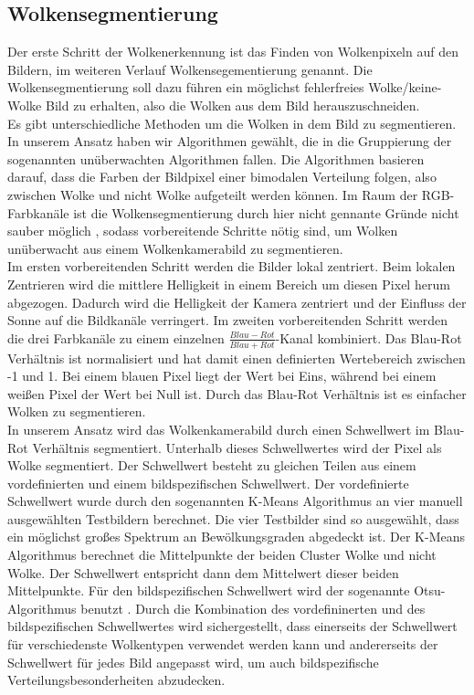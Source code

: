 \documentclass[a4paper,11pt,twoside,german]{article}
\begin{document}
\subsection{Wolkensegmentierung}
Der erste Schritt der Wolkenerkennung ist das Finden von Wolkenpixeln auf den Bildern, im weiteren Verlauf Wolkensegementierung genannt. Die Wolkensegmentierung soll dazu führen ein möglichst fehlerfreies Wolke/keine-Wolke Bild zu erhalten, also die Wolken aus dem Bild herauszuschneiden.\\
Es gibt unterschiedliche Methoden um die Wolken in dem Bild zu segmentieren. In unserem Ansatz haben wir Algorithmen gewählt, die in die Gruppierung der sogenannten unüberwachten Algorithmen fallen. Die Algorithmen basieren darauf, dass die Farben der Bildpixel einer bimodalen Verteilung folgen, also zwischen Wolke und nicht Wolke aufgeteilt werden können. Im Raum der RGB-Farbkanäle ist die Wolkensegmentierung durch hier nicht gennante Gründe nicht sauber möglich \citep{dev_14_color}, sodass vorbereitende Schritte nötig sind, um Wolken unüberwacht aus einem Wolkenkamerabild zu segmentieren.\\
Im ersten vorbereitenden Schritt werden die Bilder lokal zentriert. Beim lokalen Zentrieren wird die mittlere Helligkeit in einem Bereich um diesen Pixel herum abgezogen. Dadurch wird die Helligkeit der Kamera zentriert und der Einfluss der Sonne auf die Bildkanäle verringert. Im zweiten vorbereitenden Schritt werden die drei Farbkanäle zu einem einzelnen $\frac{Blau-Rot}{Blau+Rot}$-Kanal kombiniert. Das Blau-Rot Verhältnis ist normalisiert und hat damit einen definierten Wertebereich zwischen -1 und 1. Bei einem blauen Pixel liegt der Wert bei Eins, während bei einem weißen Pixel der Wert bei Null ist. Durch das Blau-Rot Verhältnis ist es einfacher Wolken zu segmentieren.\\
In unserem Ansatz wird das Wolkenkamerabild durch einen Schwellwert im Blau-Rot Verhältnis segmentiert. Unterhalb dieses Schwellwertes wird der Pixel als Wolke segmentiert. Der Schwellwert besteht zu gleichen Teilen aus einem vordefinierten und einem bildspezifischen Schwellwert. Der vordefinierte Schwellwert wurde durch den sogenannten K-Means Algorithmus \citep{james_13_introduction} an vier manuell ausgewählten Testbildern berechnet. Die vier Testbilder sind so ausgewählt, dass ein möglichst großes Spektrum an Bewölkungsgraden abgedeckt ist. Der K-Means Algorithmus berechnet die Mittelpunkte der beiden Cluster Wolke und nicht Wolke. Der Schwellwert entspricht dann dem Mittelwert dieser beiden Mittelpunkte. Für den bildspezifischen Schwellwert wird der sogenannte Otsu-Algorithmus benutzt \citep{otsu_75_threshold}. Durch die Kombination des vordefininerten und des bildspezifischen Schwellwertes wird sichergestellt, dass einerseits der Schwellwert für verschiedenste Wolkentypen verwendet werden kann und andererseits der Schwellwert für jedes Bild angepasst wird, um auch bildspezifische Verteilungsbesonderheiten abzudecken.\\
\end{document}
